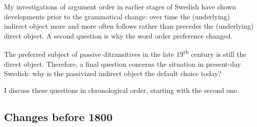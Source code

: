 \documentclass[output=paper]{langscibook}
\begin{document}
My investigations of argument order in earlier stages of Swedish have shown developments prior to the grammatical change: over time the (underlying) indirect object more and more often follows rather than precedes the (underlying) direct object. A second question is why the word order preference changed. 



The preferred subject of passive ditransitives in the late 19\textsuperscript{th} century is still the direct object. Therefore, a final question concerns the situation in present-day Swedish: why is the passivized indirect object the default choice today?



I discuss these questions in chronological order, starting with the second one.


\subsection{Changes before 1800}\label{sec:falk:5.1}
\end{document}

